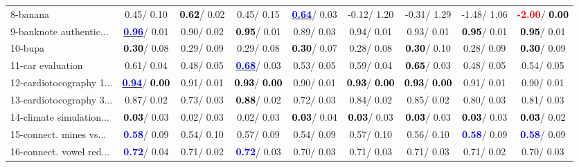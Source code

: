 \begin{table}[h]
\begin{center}
\begin{tabular}{lc|c|c|c|c|c|c|c}
8-banana &   0.45/  0.10 & \textcolor{black}{\textbf{  0.62}}/  0.02 &   0.45/  0.15 & \underline{\textcolor{blue}{\textbf{  0.64}}}/  0.03 &  -0.12/  1.20 &  -0.31/  1.29 &  -1.48/  1.06 & \textcolor{red}{\textbf{ -2.00}}/\textcolor{black}{\textbf{  0.00}} \\
9-banknote authentic... & \underline{\textcolor{blue}{\textbf{  0.96}}}/  0.01 &   0.90/  0.02 & \textcolor{black}{\textbf{  0.95}}/  0.01 &   0.89/  0.03 &   0.94/  0.01 &   0.93/  0.01 & \textcolor{black}{\textbf{  0.95}}/  0.01 & \textcolor{black}{\textbf{  0.95}}/  0.01 \\
10-bupa & \textcolor{black}{\textbf{  0.30}}/  0.08 &   0.29/  0.09 &   0.29/  0.08 & \textcolor{black}{\textbf{  0.30}}/  0.07 &   0.28/  0.08 & \textcolor{black}{\textbf{  0.30}}/  0.10 &   0.28/  0.09 & \textcolor{black}{\textbf{  0.30}}/  0.09 \\
11-car evaluation &   0.61/  0.04 &   0.48/  0.05 & \underline{\textcolor{blue}{\textbf{  0.68}}}/  0.03 &   0.53/  0.05 &   0.59/  0.04 & \textcolor{black}{\textbf{  0.65}}/  0.03 &   0.48/  0.05 &   0.54/  0.05 \\
12-cardiotocography 1... & \underline{\textcolor{blue}{\textbf{  0.94}}}/\textcolor{black}{\textbf{  0.00}} &   0.91/  0.01 & \textcolor{black}{\textbf{  0.93}}/\textcolor{black}{\textbf{  0.00}} &   0.90/  0.01 & \textcolor{black}{\textbf{  0.93}}/\textcolor{black}{\textbf{  0.00}} & \textcolor{black}{\textbf{  0.93}}/\textcolor{black}{\textbf{  0.00}} &   0.91/  0.01 &   0.90/  0.01 \\
13-cardiotocography 3... &   0.87/  0.02 &   0.73/  0.03 & \textcolor{black}{\textbf{  0.88}}/  0.02 &   0.72/  0.03 &   0.84/  0.02 &   0.85/  0.02 &   0.80/  0.03 &   0.81/  0.03 \\
14-climate simulation... & \textcolor{black}{\textbf{  0.03}}/  0.03 &   0.02/  0.03 &   0.02/  0.03 & \textcolor{black}{\textbf{  0.03}}/  0.04 & \textcolor{black}{\textbf{  0.03}}/  0.03 & \textcolor{black}{\textbf{  0.03}}/  0.03 & \textcolor{black}{\textbf{  0.03}}/  0.03 & \textcolor{black}{\textbf{  0.03}}/  0.02 \\ \hline
15-connect. mines vs... & \textcolor{blue}{\textbf{  0.58}}/  0.09 &   0.54/  0.10 &   0.57/  0.09 &   0.54/  0.09 &   0.57/  0.10 &   0.56/  0.10 & \textcolor{blue}{\textbf{  0.58}}/  0.09 & \textcolor{blue}{\textbf{  0.58}}/  0.09 \\
16-connect. vowel red... & \textcolor{blue}{\textbf{  0.72}}/  0.04 &   0.71/  0.02 & \textcolor{blue}{\textbf{  0.72}}/  0.03 &   0.70/  0.03 &   0.71/  0.03 &   0.71/  0.03 &   0.71/  0.02 &   0.70/  0.03 \\

\end{tabular}
\end{center}
\end{table}
